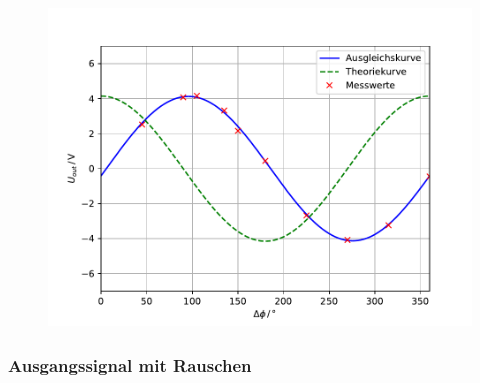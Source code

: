 \begin{figure}
\centering
\includegraphics[scale=0.5]{content/images/plot.pdf}
\end{figure}
\subsubsection{Ausgangssignal mit Rauschen}